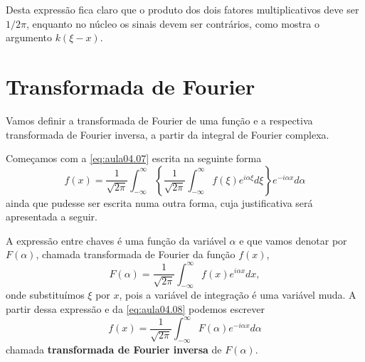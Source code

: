Desta expressão fica claro que o produto dos dois fatores multiplicativos deve ser $1/2\pi$, enquanto no núcleo os sinais devem ser contrários,
como mostra o argumento $k(\xi - x)$.



\section{Transformada de Fourier}

Vamos definir a transformada de Fourier de uma função e a respectiva transformada de Fourier inversa, a partir da integral de Fourier complexa.

Começamos com a \autoref{eq:aula04.07} escrita na seguinte forma
\begin{equation}\label{eq:aula04.08}
f(x) =
\dfrac{1}{\sqrt{2\pi}} 
\int_{-\infty}^{\infty}
\left\{
\dfrac{1}{\sqrt{2\pi}} 
\int_{-\infty}^{\infty}
f(\xi) e^{i\alpha \xi} d\xi 
\right\}
e^{-i\alpha x} d\alpha 
\end{equation}
ainda que pudesse ser escrita numa outra forma, cuja justificativa será apresentada a seguir.

A expressão entre chaves é uma função da variável $\alpha$ e que vamos denotar por $F(\alpha)$, chamada transformada de Fourier da função $f(x)$,
$$F(\alpha) =
\dfrac{1}{\sqrt{2\pi}} 
\int_{-\infty}^{\infty}
f(x) e^{i\alpha x} dx,$$
onde substituímos $\xi$ por $x$, pois a variável de integração é uma variável muda. A partir dessa expressão e da \autoref{eq:aula04.08} podemos escrever
$$f(x) = 
\dfrac{1}{\sqrt{2\pi}} 
\int_{-\infty}^{\infty}
F(\alpha) e^{-i\alpha x} d\alpha$$ 
chamada \textbf{transformada de Fourier inversa} de $F(\alpha)$.



